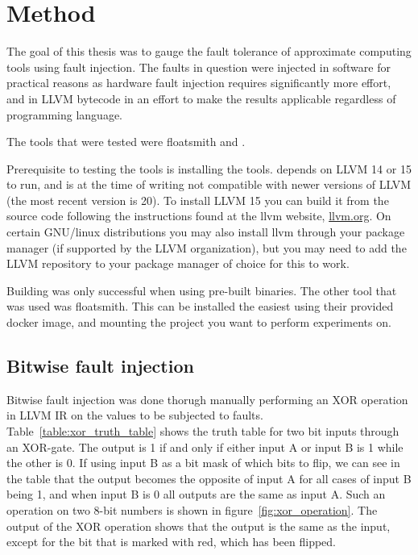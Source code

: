 \section{Method}

The goal of this thesis was to gauge the fault tolerance of approximate computing tools using fault injection. The faults in question were injected in software for practical reasons as hardware fault injection requires significantly more effort, and in LLVM bytecode in an effort to make the results applicable regardless of programming language.

The tools that were tested were floatsmith and \taffo{}.

Prerequisite to testing the tools is installing the tools. \taffo{} depends on LLVM 14 or 15 to run, and is at the time of writing not compatible with newer versions of LLVM (the most recent version is 20). To install LLVM 15 you can build it from the source code following the instructions found at the llvm website, \href{llvm.org}{llvm.org}. On certain GNU/linux distributions you may also install llvm through your package manager (if supported by the LLVM organization), but you may need to add the LLVM repository  to your package manager of choice for this to work. 

Building \taffo{} was only successful when using pre-built binaries. 
The other tool that was used was floatsmith. This can be installed the easiest using their provided docker image, and mounting the project you want to perform experiments on.

\subsection{Bitwise fault injection}
Bitwise fault injection was done thorugh manually performing an XOR operation in LLVM IR on the values to be subjected to faults. Table~\ref{table:xor_truth_table} shows the truth table for two bit inputs through an XOR-gate. The output is 1 if and only if either input A or input B is 1 while the other is 0. If using input B as a bit mask of which bits to flip, we can see in the table that the output becomes the opposite of input A for all cases of input B being 1, and when input B is 0 all outputs are the same as input A. Such an operation on two 8-bit numbers is shown in figure~\ref{fig:xor_operation}. The output of the XOR operation shows that the output is the same as the input, except for the bit that is marked with red, which has been flipped.

